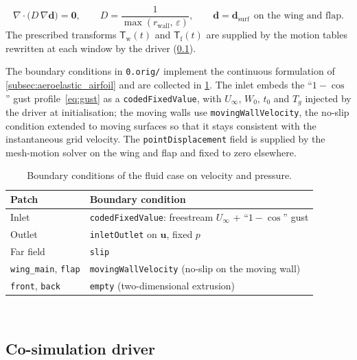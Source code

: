 \begin{equation}
    \nabla\!\cdot\!\bigl(D\,\nabla\mathbf d\bigr) = \mathbf 0,
    \qquad
    D = \frac{1}{\max(r_{\mathrm{wall}},\,\varepsilon)},
    \qquad
    \mathbf d = \mathbf d_{\mathrm{surf}}\ \ \text{on the wing and flap}.
    \label{eq:bg-laplacian}
\end{equation}
The prescribed transforms $\mathsf T_{\mathrm w}(t)$ and $\mathsf T_{\mathrm f}(t)$ are supplied by the motion tables rewritten at each window by the driver (\cref{python-struct}).

The boundary conditions in \texttt{0.orig/} implement the continuous formulation of \cref{subsec:aeroelastic_airfoil} and are collected in \cref{tab:bcs}. The inlet embeds the ``$1-\cos$'' gust profile~\eqref{eq:gust} as a \texttt{codedFixedValue}, with $U_\infty$, $W_0$, $t_0$ and $T_g$ injected by the driver at initialisation; the moving walls use \texttt{movingWallVelocity}, the no-slip condition extended to moving surfaces so that it stays consistent with the instantaneous grid velocity. The \texttt{pointDisplacement} field is supplied by the mesh-motion solver on the wing and flap and fixed to zero elsewhere.

\begin{table}[t]
    \centering
    \begin{tabular}{|p{}|p{}|}
    \hline
    \rowcolor{bluePoli!40}
    Patch & Boundary condition \T\B \\
    \hline\hline
    Inlet & \texttt{codedFixedValue}: freestream $U_\infty$ + ``$1-\cos$'' gust \T\B \\
    Outlet & \texttt{inletOutlet} on $\mathbf u$, fixed $p$ \T\B \\
    Far field & \texttt{slip} \T\B \\
    \texttt{wing\_main}, \texttt{flap} & \texttt{movingWallVelocity} (no-slip on the moving wall) \T\B \\
    \texttt{front}, \texttt{back} & \texttt{empty} (two-dimensional extrusion) \B \\
    \hline
    \end{tabular}
    \\[6pt]
    \caption{Boundary conditions of the fluid case on velocity and pressure.}
    \label{tab:bcs}
\end{table}


\subsection{Co-simulation driver}
\label{python-struct}

